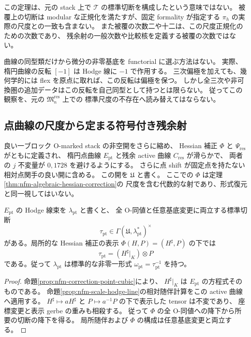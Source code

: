 \begin{remark}[正規化と標準尺度の区別]
この定理は、元の stack 上で $\mathscr T$ の標準切断を構成したという意味ではない。
被覆上の切断は modular な正規化を満たすが、固定 formality が指定する
$\pi_h$ の実際の尺度との一致も含まない。
また被覆の次数二や十二は、この尺度正規化のための次数であり、
残余射の一般次数や比較核を定義する被覆の次数ではない。

曲線の同型類だけから微分の非零基底を functorial に選ぶ方法はない。
実際、楕円曲線の反転 $[-1]$ は Hodge 線に $-1$ で作用する。
三次偏極を加えても、幾何学的には flex を原点に取れば、この反転は偏極を保つ。
しかし全三次や非可換圏の追加データはこの反転を自己同型として持つとは限らない。
従ってこの観察を、元の $\mathfrak M_n^{\mathrm{res}}$ 上での
標準尺度の不存在へ読み替えてはならない。
\end{remark}

\subsection{点曲線の尺度から定まる符号付き残余射}

良い一ブロック O-marked stack の非空開をさらに縮め、
Hessian 補正 $\Phi$ と $\Psi_{\mathrm{res}}$ がともに定義され、
楕円点曲線 $E_{\mathrm{pt}}$ と残余 active 曲線 $C_{\mathrm{res}}$ が滑らかで、
両者の $j$ 不変量が $0,1728$ を避けるようにする。
さらに点 shift が固定点を持たない相対点関手の良い開に含める。
この開を $\mathfrak U$ と書く。
ここでの $\Phi$ は定理\ref{thm:nfm-algebraic-hessian-correction}の
尺度を含む代数的な射であり、形式復元と同一視してはいない。

\begin{lemma}[楕円点曲線の標準微分]
\label{lem:nfm-point-hodge-scale}
$E_{\mathrm{pt}}$ の Hodge 線束を $\lambda_{\mathrm{pt}}$ と書くと、
全 O-同値と任意基底変更に両立する標準切断
\[
 \tau_{\mathrm{pt}}\in
 \Gamma(\mathfrak U,\lambda_{\mathrm{pt}}^*)^\times
\]
がある。局所的な Hessian 補正の表示 $\Phi(H,P)=(H^\sharp,P)$ の下では
\[
 \tau_{\mathrm{pt}}=(H^\sharp|_K)\otimes P
\]
である。従って $\lambda_{\mathrm{pt}}$ は標準的な非零一形式
$\omega_{\mathrm{pt}}=\tau_{\mathrm{pt}}^{-1}$ を持つ。
\end{lemma}

\begin{proof}
命題\ref{prop:nfm-correction-point-cubic}により、
$H^\sharp|_K$ は $E_{\mathrm{pt}}$ の方程式そのものである。
命題\ref{prop:nfm-scale-hodge-line}の相対随伴計算をこの active 曲線へ適用する。
$H^\sharp\mapsto aH^\sharp$ と $P\mapsto a^{-1}P$ の下で表示した tensor は不変であり、
座標変更と表示 gerbe の重みも相殺する。
従って $\Phi$ の全 O-同値への降下から所要の切断の降下を得る。
局所随伴および $\Phi$ の構成は任意基底変更と両立する。
\end{proof}

